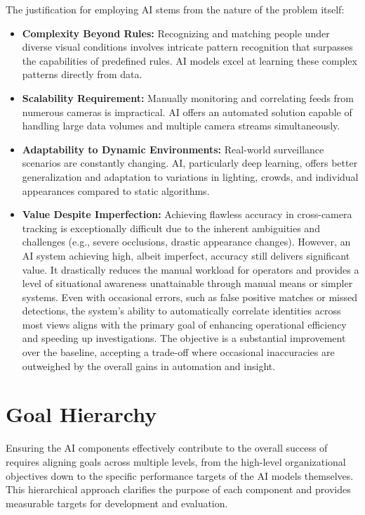 The justification for employing AI stems from the nature of the problem itself:
\begin{itemize}
    \item \textbf{Complexity Beyond Rules:} Recognizing and matching people under diverse visual conditions involves intricate pattern recognition that surpasses the capabilities of predefined rules. AI models excel at learning these complex patterns directly from data.
    \item \textbf{Scalability Requirement:} Manually monitoring and correlating feeds from numerous cameras is impractical. AI offers an automated solution capable of handling large data volumes and multiple camera streams simultaneously.
    \item \textbf{Adaptability to Dynamic Environments:} Real-world surveillance scenarios are constantly changing. AI, particularly deep learning, offers better generalization and adaptation to variations in lighting, crowds, and individual appearances compared to static algorithms.
    \item \textbf{Value Despite Imperfection:} Achieving flawless accuracy in cross-camera tracking is exceptionally difficult due to the inherent ambiguities and challenges (e.g., severe occlusions, drastic appearance changes). However, an AI system achieving high, albeit imperfect, accuracy still delivers significant value. It drastically reduces the manual workload for operators and provides a level of situational awareness unattainable through manual means or simpler systems. Even with occasional errors, such as false positive matches or missed detections, the system's ability to automatically correlate identities across most views aligns with the primary goal of enhancing operational efficiency and speeding up investigations. The objective is a substantial improvement over the baseline, accepting a trade-off where occasional inaccuracies are outweighed by the overall gains in automation and insight.
\end{itemize}



\section{Goal Hierarchy}
\label{section:goal-hierarchy}

Ensuring the AI components effectively contribute to the overall success of \usevar{\srsTitle} requires aligning goals across multiple levels, from the high-level organizational objectives down to the specific performance targets of the AI models themselves. This hierarchical approach clarifies the purpose of each component and provides measurable targets for development and evaluation.

